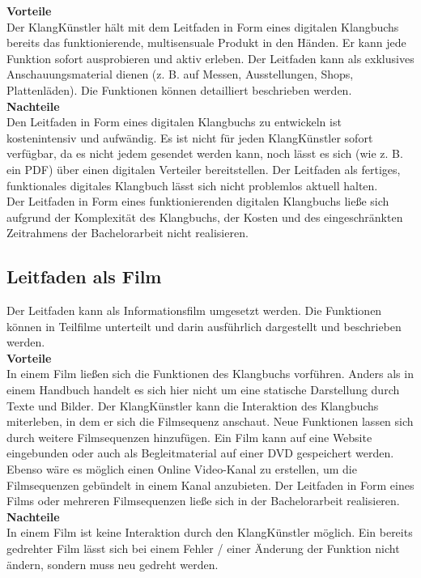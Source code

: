\textbf{Vorteile}\\
Der KlangKünstler hält mit dem Leitfaden in Form eines digitalen Klangbuchs bereits das funktionierende, multisensuale Produkt in den Händen. Er kann jede Funktion sofort ausprobieren und aktiv erleben. Der Leitfaden kann als exklusives Anschauungsmaterial dienen (z. B. auf Messen, Ausstellungen, Shops, Plattenläden). Die Funktionen können detailliert beschrieben werden.\\

\textbf{Nachteile}\\
Den Leitfaden in Form eines digitalen Klangbuchs zu entwickeln ist kostenintensiv und aufwändig. Es ist nicht für jeden KlangKünstler sofort verfügbar, da es nicht jedem gesendet werden kann, noch lässt es sich (wie z. B. ein PDF) über einen digitalen Verteiler bereitstellen. Der Leitfaden als fertiges, funktionales digitales Klangbuch lässt sich nicht problemlos aktuell halten.\\Der Leitfaden in Form eines funktionierenden digitalen Klangbuchs ließe sich aufgrund der Komplexität des Klangbuchs, der Kosten und des eingeschränkten Zeitrahmens der Bachelorarbeit nicht realisieren.




\subsection{Leitfaden als Film}\label{LeitfadenAlsFilm}
Der Leitfaden kann als Informationsfilm umgesetzt werden. Die Funktionen können in Teilfilme unterteilt und darin ausführlich dargestellt und beschrieben werden.\\


\textbf{Vorteile}\\
In einem Film ließen sich die Funktionen des Klangbuchs vorführen. Anders als in einem Handbuch handelt es sich hier nicht um eine statische Darstellung durch Texte und Bilder. Der KlangKünstler kann die Interaktion des Klangbuchs miterleben, in dem er sich die Filmsequenz anschaut. Neue Funktionen lassen sich durch weitere Filmsequenzen hinzufügen. Ein Film kann auf eine Website eingebunden oder auch als Begleitmaterial auf einer DVD gespeichert werden. Ebenso wäre es möglich einen Online Video-Kanal zu erstellen, um die Filmsequenzen gebündelt in einem Kanal anzubieten. Der Leitfaden in Form eines Films oder mehreren Filmsequenzen ließe sich in der Bachelorarbeit realisieren.\\


\textbf{Nachteile}\\
In einem Film ist keine Interaktion durch den KlangKünstler möglich. Ein bereits gedrehter Film lässt sich bei einem Fehler / einer Änderung der Funktion nicht ändern, sondern muss neu gedreht werden.


